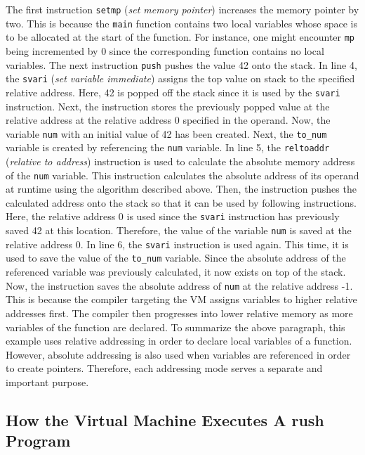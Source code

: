 The first instruction \texttt{setmp} (\emph{set memory pointer}) increases the memory pointer by two.
This is because the \texttt{main} function contains two local variables whose space is to be allocated at the start of the function.
For instance, one might encounter \texttt{mp} being incremented by 0 since the corresponding function contains no local variables.
The next instruction \texttt{push} pushes the value 42 onto the stack.
In line 4, the \texttt{svari} (\emph{set variable immediate}) assigns the top value on stack to the specified relative address.
Here, 42 is popped off the stack since it is used by the \texttt{svari} instruction.
Next, the instruction stores the previously popped value at the relative address at the relative address 0 specified in the operand.
Now, the variable \texttt{num} with an initial value of 42 has been created.
Next, the \texttt{to\_num} variable is created by referencing the \texttt{num} variable.
In line 5, the \texttt{reltoaddr} (\emph{relative to address}) instruction is used to calculate the absolute memory address of the \texttt{num} variable.
This instruction calculates the absolute address of its operand at runtime using the algorithm described above.
Then, the instruction pushes the calculated address onto the stack so that it can be used by following instructions.
Here, the relative address 0 is used since the \texttt{svari} instruction has previously saved 42 at this location.
Therefore, the value of the variable \texttt{num} is saved at the relative address 0.
In line 6, the \texttt{svari} instruction is used again.
This time, it is used to save the value of the \texttt{to\_num} variable.
Since the absolute address of the referenced variable was previously calculated, it now exists on top of the stack.
Now, the instruction saves the absolute address of \texttt{num} at the relative address -1.
This is because the compiler targeting the VM assigns variables to higher relative addresses first.
The compiler then progresses into lower relative memory as more variables of the function are declared.
To summarize the above paragraph, this example uses relative addressing in order to declare local variables of a function.
However, absolute addressing is also used when variables are referenced in order to create pointers.
Therefore, each addressing mode serves a separate and important purpose.


\subsection{How the Virtual Machine Executes A rush Program}

